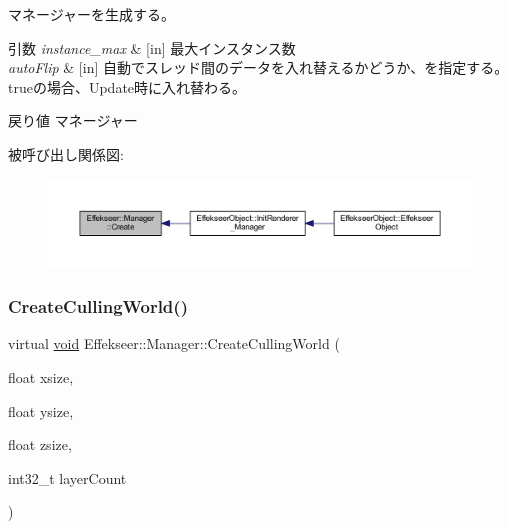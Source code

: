 マネージャーを生成する。 


\begin{DoxyParams}{引数}
{\em instance\+\_\+max} & \mbox{[}in\mbox{]} 最大インスタンス数 \\
\hline
{\em auto\+Flip} & \mbox{[}in\mbox{]} 自動でスレッド間のデータを入れ替えるかどうか、を指定する。trueの場合、\+Update時に入れ替わる。 \\
\hline
\end{DoxyParams}
\begin{DoxyReturn}{戻り値}
マネージャー 
\end{DoxyReturn}
被呼び出し関係図\+:\nopagebreak
\begin{figure}[H]
\begin{center}
\leavevmode
\includegraphics[width=350pt]{class_effekseer_1_1_manager_a1de74a159f3646d325f49e940e72181c_icgraph}
\end{center}
\end{figure}
\mbox{\label{class_effekseer_1_1_manager_a38e954ce0e584f2830d90b5d7763614b}} 
\subsubsection{\texorpdfstring{Create\+Culling\+World()}{CreateCullingWorld()}}
{\footnotesize\ttfamily virtual \mbox{\hyperlink{namespace_effekseer_ab34c4088e512200cf4c2716f168deb56}{void}} Effekseer\+::\+Manager\+::\+Create\+Culling\+World (\begin{DoxyParamCaption}\item[{float}]{xsize,  }\item[{float}]{ysize,  }\item[{float}]{zsize,  }\item[{int32\+\_\+t}]{layer\+Count }\end{DoxyParamCaption})\hspace{0.3cm}{\ttfamily [pure virtual]}}



